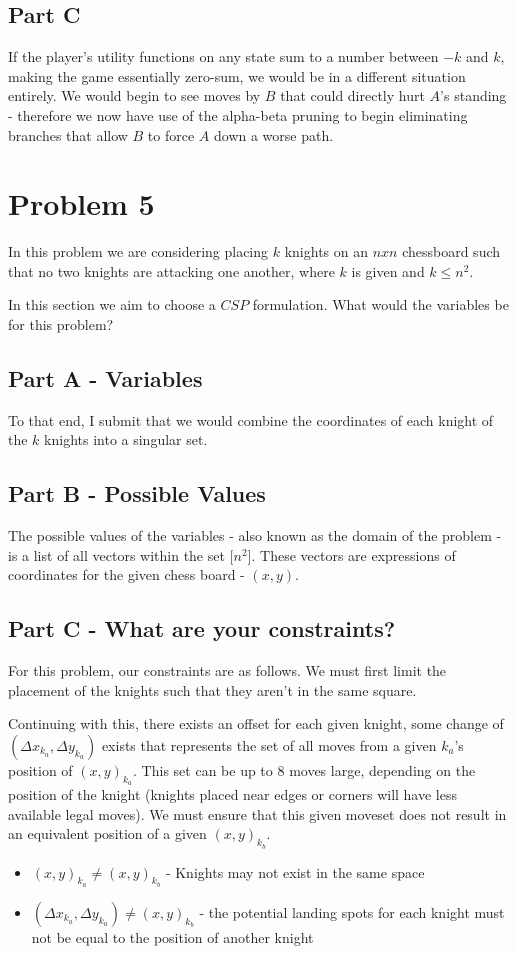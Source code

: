 \documentclass{article}
\begin{document}
\subsection*{Part C}
If the player's utility functions on any state sum to a number between $-k$ and $k$, making the game essentially zero-sum, we would be in a different situation entirely. We would begin to see moves by $B$ that could directly hurt $A$'s standing - therefore we now have use of the alpha-beta pruning to begin eliminating branches that allow $B$ to force $A$ down a worse path.

\section*{Problem 5}

In this problem we are considering placing $k$ knights on an $nxn$ chessboard such that no two knights are attacking one another, where $k$ is given and $k \leq n^2$.

In this section we aim to choose a $CSP$ formulation. What would the variables be for this problem?


\subsection*{Part A - Variables}

To that end, I submit that we would combine the coordinates of each knight of the $k$ knights into a singular set.

\subsection*{Part B - Possible Values}

The possible values of the variables - also known as the domain of the problem - is a list of all vectors within the set $ \lbrack n^2 \rbrack$. These vectors are expressions of coordinates for the given chess board - $(x,y)$.

\subsection*{Part C - What are your constraints?}

For this problem, our constraints are as follows. We must first limit the placement of the knights such that they aren't in the same square.

Continuing with this, there exists an offset for each given knight, some change of $(\Delta x_{k_a}, \Delta y_{k_a})$ exists that represents the set of all moves from a given $k_a$'s position of $(x,y)_{k_a}$. This set can be up to 8 moves large, depending on the position of the knight (knights placed near edges or corners will have less available legal moves). We must ensure that this given moveset does not result in an equivalent position of a given $(x,y)_{k_b}$.

\begin{itemize}
    \item $(x,y)_{k_a} \neq (x,y)_{k_b}$ - Knights may not exist in the same space
    \item $(\Delta x_{k_a}, \Delta y_{k_a}) \neq (x,y)_{k_b}$ - the potential landing spots for each knight must not be equal to the position of another knight
\end{itemize}
\end{document}
